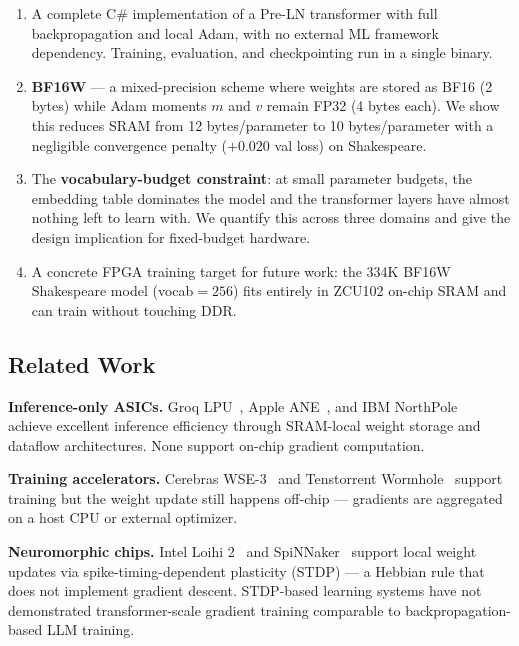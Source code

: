 \documentclass[11pt]{article}
\newcommand{\bfsixteenloss}{0.020}
\begin{document}
\begin{enumerate}
  \item A complete C\# implementation of a Pre-LN transformer with full backpropagation
    and local Adam, with no external ML framework dependency.
    Training, evaluation, and checkpointing run in a single binary.

  \item \textbf{BF16W} --- a mixed-precision scheme where weights are stored as BF16
    (2 bytes) while Adam moments $m$ and $v$ remain FP32 (4 bytes each). We show this
    reduces SRAM from 12 bytes/parameter to 10 bytes/parameter with a negligible
    convergence penalty ($+\bfsixteenloss$ val loss) on Shakespeare.

  \item The \textbf{vocabulary-budget constraint}: at small parameter budgets, the
    embedding table dominates the model and the transformer layers have almost nothing
    left to learn with. We quantify this across three domains and give the design
    implication for fixed-budget hardware.

  \item A concrete FPGA training target for future work: the 334K BF16W Shakespeare model
    (vocab$=256$) fits entirely in ZCU102 on-chip SRAM and can train without touching DDR.
\end{enumerate}

\subsection{Related Work}

\textbf{Inference-only ASICs.}
Groq LPU~\cite{groq}, Apple ANE~\cite{apple_ane}, and IBM NorthPole~\cite{ibm_northpole}
achieve excellent inference efficiency through SRAM-local weight storage and dataflow
architectures. None support on-chip gradient computation.

\textbf{Training accelerators.}
Cerebras WSE-3~\cite{cerebras} and Tenstorrent Wormhole~\cite{tenstorrent} support
training but the weight update still happens off-chip --- gradients are aggregated
on a host CPU or external optimizer.

\textbf{Neuromorphic chips.}
Intel Loihi 2~\cite{loihi2} and SpiNNaker~\cite{spinnaker} support local weight updates
via spike-timing-dependent plasticity (STDP) --- a Hebbian rule that does not implement
gradient descent. STDP-based learning systems have not demonstrated transformer-scale
gradient training comparable to backpropagation-based LLM training.
\end{document}

